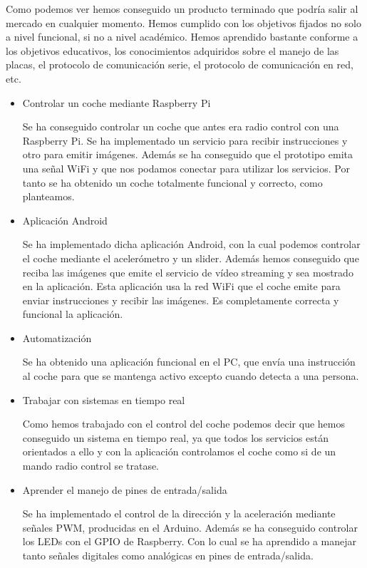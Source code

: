 \documentclass{pclass}
\begin{document}

	Como podemos ver hemos conseguido un producto terminado que podría salir al mercado en cualquier momento. Hemos cumplido con los objetivos fijados no solo a nivel funcional, si no a nivel académico. Hemos aprendido bastante conforme a los objetivos educativos, los conocimientos adquiridos sobre el manejo de las placas, el protocolo de comunicación serie, el protocolo de comunicación en red, etc. 
	
	\begin{itemize}
		\item Controlar un coche mediante Raspberry Pi
		
			Se ha conseguido controlar un coche que antes era radio control con una Raspberry Pi. Se ha implementado un servicio para recibir instrucciones y otro para emitir imágenes. Además se ha conseguido que el prototipo emita una señal WiFi y que nos podamos conectar para utilizar los servicios. Por tanto se ha obtenido un coche totalmente funcional y correcto, como planteamos.
			
		\item Aplicación Android
		
			Se ha implementado dicha aplicación Android, con la cual podemos controlar el coche mediante el acelerómetro y un slider. Además hemos conseguido que reciba las imágenes que emite el servicio de vídeo streaming y sea mostrado en la aplicación. Esta aplicación usa la red WiFi que el coche emite para enviar instrucciones y recibir las imágenes. Es completamente correcta y funcional la aplicación.
			
		\item Automatización
		
			Se ha obtenido una aplicación funcional en el PC, que envía una instrucción al coche para que se mantenga activo excepto cuando detecta a una persona.
			
		\item Trabajar con sistemas en tiempo real
		
			Como hemos trabajado con el control del coche podemos decir que hemos conseguido un sistema en tiempo real, ya que todos los servicios están orientados a ello y con la aplicación controlamos el coche como si de un mando radio control se tratase.
			
		\item Aprender el manejo de pines de entrada/salida
			
			Se ha implementado el control de la dirección y la aceleración mediante señales PWM, producidas en el Arduino. Además se ha conseguido controlar los LEDs con el GPIO de Raspberry. Con lo cual se ha aprendido a manejar tanto señales digitales como analógicas en pines de entrada/salida.
	

\end{itemize}
\end{document}
